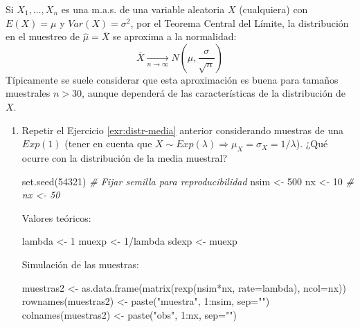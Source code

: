 \documentclass[
]{book}
\newenvironment{Shaded}{\begin{snugshade}}{\end{snugshade}}
\newcommand{\AttributeTok}[1]{\textcolor[rgb]{0.77,0.63,0.00}{#1}}
\newcommand{\CommentTok}[1]{\textcolor[rgb]{0.56,0.35,0.01}{\textit{#1}}}
\newcommand{\DecValTok}[1]{\textcolor[rgb]{0.00,0.00,0.81}{#1}}
\newcommand{\FunctionTok}[1]{\textcolor[rgb]{0.00,0.00,0.00}{#1}}
\newcommand{\NormalTok}[1]{#1}
\newcommand{\OtherTok}[1]{\textcolor[rgb]{0.56,0.35,0.01}{#1}}
\newcommand{\SpecialCharTok}[1]{\textcolor[rgb]{0.00,0.00,0.00}{#1}}
\newcommand{\StringTok}[1]{\textcolor[rgb]{0.31,0.60,0.02}{#1}}
\theoremstyle{break}
\theoremstyle{definition}
\theoremstyle{definition}
\theoremstyle{definition}
\theoremstyle{definition}
\theoremstyle{remark}
\begin{document}
Si \(X_{1},\ldots,X_{n}\) es una m.a.s. de una variable aleatoria
\(X\) (cualquiera) con \(E\left( X \right) = \mu\) y
\(Var\left( X \right) = \sigma^{2}\), por el Teorema Central del Límite,
la distribución en el muestreo de \(\hat{\mu}=\overline{X}\) se aproxima a la
normalidad:
\[\overline{X}\underset{n\rightarrow\infty}{\longrightarrow}
N\left( \mu, \dfrac{\sigma}{\sqrt{n}}\right)\]
Típicamente se suele considerar que esta aproximación es buena
para tamaños muestrales \(n>30\),
aunque dependerá de las características de la distribución de \(X\).

\begin{enumerate}
\def\labelenumi{\alph{enumi})}
\item
  Repetir el Ejercicio \ref{exr:distr-media} anterior considerando muestras de una \(Exp(1)\) (tener en cuenta que \(X\sim Exp(\lambda)\Rightarrow\mu_{X}=\sigma_{X}=1/\lambda\)).
  ¿Qué ocurre con la distribución de la media muestral?

\begin{Shaded}
\begin{Highlighting}[]
\FunctionTok{set.seed}\NormalTok{(}\DecValTok{54321}\NormalTok{) }\CommentTok{\# Fijar semilla para reproducibilidad}
\NormalTok{nsim }\OtherTok{\textless{}{-}} \DecValTok{500}
\NormalTok{nx }\OtherTok{\textless{}{-}} \DecValTok{10}    
\CommentTok{\# nx \textless{}{-} 50}
\end{Highlighting}
\end{Shaded}

  Valores teóricos:

\begin{Shaded}
\begin{Highlighting}[]
\NormalTok{lambda }\OtherTok{\textless{}{-}} \DecValTok{1}
\NormalTok{muexp }\OtherTok{\textless{}{-}} \DecValTok{1}\SpecialCharTok{/}\NormalTok{lambda}
\NormalTok{sdexp }\OtherTok{\textless{}{-}}\NormalTok{ muexp}
\end{Highlighting}
\end{Shaded}

  Simulación de las muestras:

\begin{Shaded}
\begin{Highlighting}[]
\NormalTok{muestras2 }\OtherTok{\textless{}{-}} \FunctionTok{as.data.frame}\NormalTok{(}\FunctionTok{matrix}\NormalTok{(}\FunctionTok{rexp}\NormalTok{(nsim}\SpecialCharTok{*}\NormalTok{nx, }\AttributeTok{rate=}\NormalTok{lambda), }\AttributeTok{ncol=}\NormalTok{nx))}
\FunctionTok{rownames}\NormalTok{(muestras2) }\OtherTok{\textless{}{-}} \FunctionTok{paste}\NormalTok{(}\StringTok{"muestra"}\NormalTok{, }\DecValTok{1}\SpecialCharTok{:}\NormalTok{nsim, }\AttributeTok{sep=}\StringTok{""}\NormalTok{)}
\FunctionTok{colnames}\NormalTok{(muestras2) }\OtherTok{\textless{}{-}} \FunctionTok{paste}\NormalTok{(}\StringTok{"obs"}\NormalTok{, }\DecValTok{1}\SpecialCharTok{:}\NormalTok{nx, }\AttributeTok{sep=}\StringTok{""}\NormalTok{)}
\end{Highlighting}
\end{Shaded}


\end{enumerate}
\end{document}
